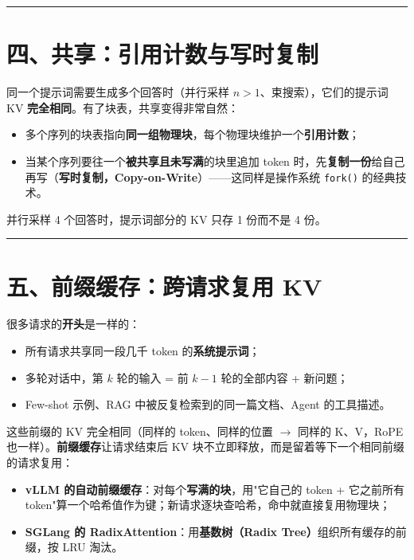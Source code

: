 \vspace{0.8em}\hrule\vspace{0.8em}

\section{四、共享：引用计数与写时复制}

同一个提示词需要生成多个回答时（并行采样 $n > 1$、束搜索），它们的提示词 KV \textbf{完全相同}。有了块表，共享变得非常自然：
\begin{itemize}
  \item 多个序列的块表指向\textbf{同一组物理块}，每个物理块维护一个\textbf{引用计数}；
  \item 当某个序列要往一个\textbf{被共享且未写满}的块里追加 token 时，先\textbf{复制一份}给自己再写（\textbf{写时复制，Copy-on-Write}）——这同样是操作系统 \texttt{fork()} 的经典技术。
\end{itemize}

并行采样 4 个回答时，提示词部分的 KV 只存 1 份而不是 4 份。

\vspace{0.8em}\hrule\vspace{0.8em}

\section{五、前缀缓存：跨请求复用 KV}

很多请求的\textbf{开头}是一样的：
\begin{itemize}
  \item 所有请求共享同一段几千 token 的\textbf{系统提示词}；
  \item 多轮对话中，第 $k$ 轮的输入 = 前 $k-1$ 轮的全部内容 + 新问题；
  \item Few-shot 示例、RAG 中被反复检索到的同一篇文档、Agent 的工具描述。
\end{itemize}

这些前缀的 KV 完全相同（同样的 token、同样的位置 $\rightarrow$ 同样的 K、V，RoPE 也一样）。\textbf{前缀缓存}让请求结束后 KV 块不立即释放，而是留着等下一个相同前缀的请求复用：
\begin{itemize}
  \item \textbf{vLLM 的自动前缀缓存}：对每个\textbf{写满的块}，用"它自己的 token + 它之前所有 token"算一个哈希值作为键；新请求逐块查哈希，命中就直接复用物理块；
  \item \textbf{SGLang 的 RadixAttention}：用\textbf{基数树（Radix Tree）}组织所有缓存的前缀，按 LRU 淘汰。
\end{itemize}

